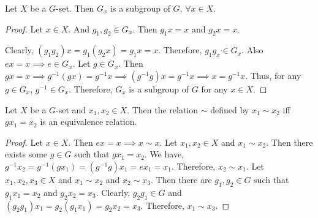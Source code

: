 \begin{theorem}
	Let $X$ be a $G$-set.
	Then $G_x$ is a subgroup of $G$, $\forall x \in X$.
\end{theorem}
\begin{proof}
	Let $x \in X$.
	And $g_1, g_2 \in G_x$.
	Then $g_1x = x$ and $g_2x = x$.

	Clearly, $(g_1g_2)x = g_1(g_2x) = g_1x = x$.
	Therefore, $g_1g_x \in G_x$.
	Also $ex = x \implies e \in G_x$.
	Let $g \in G_x$.
	Then $gx = x \implies g^{-1}(gx) = g^{-1}x \implies (g^{-1}g)x = g^{-1}x \implies x = g^{-1}x$.
	Thus, for any $g \in G_x$, $g^{-1} \in G_x$.
	Therefore, $G_x$ is a subgroup of $G$ for any $x \in X$.
\end{proof}

\begin{theorem}
	Let $X$ be a $G$-set and $x_1,x_2 \in X$.
	Then the relation $\sim$ defined by $x_1 \sim x_2$ iff $gx_1 = x_2$ is an equivalence relation.
\end{theorem}
\begin{proof}
	Let $x \in X$.
	Then $ex = x \implies x \sim x$.
	Let $x_1, x_2 \in X$ and $x_1 \sim x_2$.
	Then there exists some $g \in G$ such that $gx_1 = x_2$.
	We have, $g^{-1}x_2 = g^{-1}(gx_1) = (g^{-1}g)x_1 = ex_1 = x_1$.
	Therefore, $x_2 \sim x_1$.
	Let $x_1,x_2,x_3 \in X$ and $x_1 \sim x_2$ and $x_2 \sim x_3$.
	Then there are $g_1,g_2 \in G$ such that $g_1x_1 = x_2$ and $g_2x_2 = x_3$.
	Clearly, $g_2g_1 \in G$ and $(g_2g_1)x_1 = g_2(g_1x_1) = g_2x_2 = x_3$.
	Therefore, $x_1 \sim x_3$.
\end{proof}


